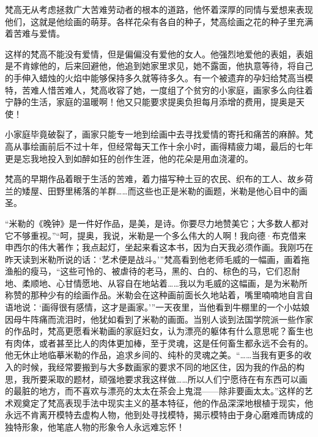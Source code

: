 \documentclass{article}
\begin{document}
梵高无从考虑拯救广大苦难劳动者的根本的道路，他怀着深厚的同情与爱想来表现他们，这就是他绘画的萌芽。各样花朵有各自的种子，梵高绘画之花的种子里充满着苦难与爱情。

这样的梵高不能没有爱情，但是偏偏没有爱他的女人。他强烈地爱他的表姐，表姐是不肯嫁他的，后来回避他，他追到她家里求见，她不露面，他执意等待，将自己的手伸入蜡烛的火焰中能够保持多久就等待多久。有一个被遗弃的孕妇给梵高当模特，苦难人惜苦难人，梵高收容了她，一度组了个贫穷的小家庭，画家多么向往着宁静的生活，家庭的温暖啊！他又只能要求提奥负担每月添增的费用，提奥是天使！

小家庭毕竟破裂了，画家只能专一地到绘画中去寻找爱情的寄托和痛苦的麻醉。梵高从事绘画前后不过十年，但经常每天工作十余小时，画得精疲力竭，最后的七年更是忘我地投入到如醉如狂的创作生涯，他的花朵是用血浇灌的。

梵高的早期作品着眼于生活的苦难，着力描写种土豆的农民、织布的工人、故乡荷兰的矮屋、田野里稀落的羊群……而这些也正是米勒的画题，米勒是他心目中的画圣。

“米勒的《晚钟》是一件好作品，是美，是诗。你要尽力地赞美它；大多数人都对它不够重视。”“呵，提奥，我说，米勒是一个多么伟大的人啊！我向德·布克借来申西尔的伟大著作；我点起灯，坐起来看这本书，因为白天我必须作画。我刚巧在昨天读到米勒所说的话：‘艺术便是战斗。’”梵高看到他老师毛威的一幅画，画着拖渔船的瘦马，“这些可怜的、被虐待的老马，黑的、白的、棕色的马，它们忍耐地、柔顺地、心甘情愿地、从容自在地站着……我以为毛威的这幅画，是为米勒所称赞的那种少有的绘画作品。米勒会在这种画前面长久地站着，嘴里喃喃地自言自语地说：‘画得很有感情，这才是画家。’”一天夜里，当他看到牛棚里的一个小姑娘因母牛阵痛而流泪时，他犹如看到了米勒的画面。当别人谈到法国学院派一些作家的作品时，梵高更愿看米勒画的家庭妇女，认为漂亮的躯体有什么意思呢？畜生也有肉体，或者甚至比人的肉体更加棒，至于灵魂，这是任何畜生都永远不会有的。他无休止地临摹米勒的作品，追求乡间的、纯朴的灵魂之美。“……当我有更多的收入的时候，我经常要搬到与大多数画家的要求不同的地区住，因为我的作品的构思，我所要采取的题材，顽强地要求我这样做……所以人们宁愿待在有东西可以画的最脏的地方，而不喜欢与漂亮的太太在茶会上鬼混——除非要画太太。”这样的艺术观奠定了梵高表现手法中现实主义的基本特征，他的作品深深地根植于现实，他永远不肯离开模特去虚构人物，他到处寻找模特，揭示模特由于身心磨难而铸成的独特形象，他笔底人物的形象令人永远难忘怀！
\end{document}
